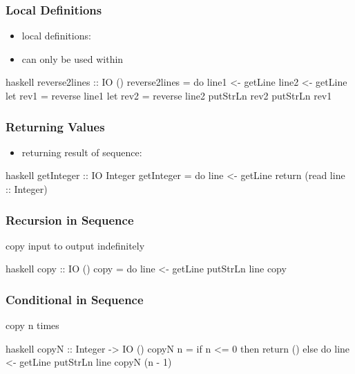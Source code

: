 \documentclass[dvipsnames]{beamer}
\theoremstyle{plain}
\begin{document}
\begin{frame}[fragile]
  \frametitle{Local Definitions}

  \begin{itemize}
    \item local definitions: 
    \item can only be used within 
  \end{itemize}

  \begin{exampleblock}{}
    \begin{pygments}{haskell}
reverse2lines :: IO ()
reverse2lines = do line1 <- getLine
                   line2 <- getLine
                   let rev1 = reverse line1
                   let rev2 = reverse line2
                   putStrLn rev2
                   putStrLn rev1
    \end{pygments}
  \end{exampleblock}
\end{frame}

\begin{frame}[fragile]
  \frametitle{Returning Values}

  \begin{itemize}
    \item returning result of sequence: 
  \end{itemize}

  \begin{exampleblock}{}
    \begin{pygments}{haskell}
getInteger :: IO Integer
getInteger = do line <- getLine
                return (read line :: Integer)
    \end{pygments}
  \end{exampleblock}
\end{frame}

\begin{frame}[fragile]
  \frametitle{Recursion in Sequence}

  \begin{exampleblock}{copy input to output indefinitely}
    \begin{pygments}{haskell}
copy :: IO ()
copy = do line <- getLine
          putStrLn line
          copy
    \end{pygments}
  \end{exampleblock}
\end{frame}

\begin{frame}[fragile]
  \frametitle{Conditional in Sequence}

  \begin{exampleblock}{copy n times}
    \begin{pygments}{haskell}
copyN :: Integer -> IO ()
copyN n =
    if n <= 0
        then return ()
        else do line <- getLine
                putStrLn line
                copyN (n - 1)
    \end{pygments}
  \end{exampleblock}
\end{frame}
\end{document}
